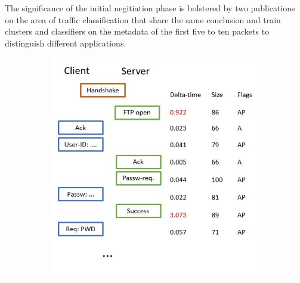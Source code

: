 \documentclass[a4paper,12pt,twoside]{report}
\begin{document}
The significance of the initial negitiation phase is bolstered by two publications on the area of traffic classification that share the same conclusion and train clusters and classifiers on the metadata of the first five to ten packets to distinguish different applications\cite{bernaille2006traffic,crotti2007traffic}.


\begin{figure}\label{negot}
\centering
\begin{subfigure}[b]{0.49\textwidth}\label{FTP}
\includegraphics[width=\textwidth]{images/FTP.jpg}
\caption{}
\end{subfigure}
\begin{subfigure}[b]{0.49\textwidth}\label{SSH}

\end{subfigure}
\end{figure}
\end{document}
